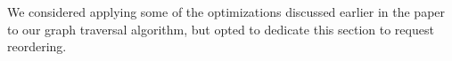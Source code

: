 \documentclass[10pt,letterpaper,twocolumn,english]{article}
\newcommand{\oasys}{OASYS\xspace}
\begin{document}
We considered applying some of the optimizations discussed earlier in
the paper to our graph traversal algorithm, but opted to dedicate this
section to request reordering.  

%
%
%
%
%    
% 
%
%
%
%
%
%    
%
%
\end{document}
